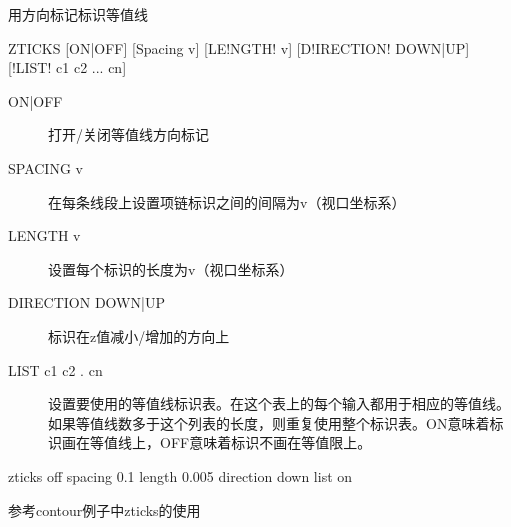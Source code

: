 \label{cmd:zticks}

用方向标记标识等值线

\begin{SACSTX}
ZTICKS [ON|OFF] [Spacing v] [LE!NGTH! v] [D!IRECTION! DOWN|UP] [!LIST! c1 c2 ... cn]
\end{SACSTX}

\begin{description}
\item [ON|OFF] 打开/关闭等值线方向标记 
\item [SPACING v] 在每条线段上设置项链标识之间的间隔为v（视口坐标系） 
\item [LENGTH v] 设置每个标识的长度为v（视口坐标系） 
\item [DIRECTION DOWN|UP] 标识在z值减小/增加的方向上 
\item [LIST c1 c2 . cn] 设置要使用的等值线标识表。在这个表上的每个输入都用于相应的等值线。如果等值线数多于这个列表的长度，则重复使用整个标识表。ON意味着标识画在等值线上，OFF意味着标识不画在等值限上。 
\end{description}

\begin{SACDFT}
zticks off spacing 0.1 length 0.005 direction down list on
\end{SACDFT}

参考contour例子中zticks的使用

